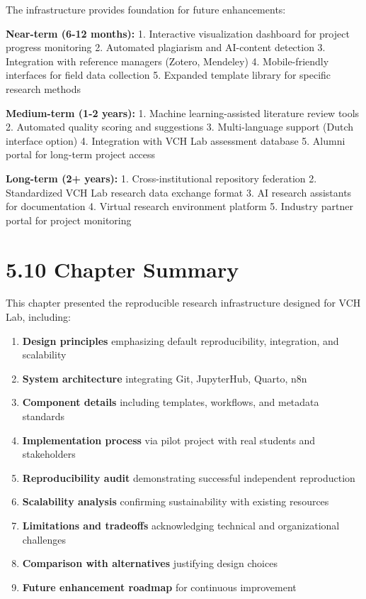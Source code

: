 \documentclass[
  oneside,
  open=any]{scrbook}
\providecommand{\tightlist}{%
  \setlength{\itemsep}{0pt}\setlength{\parskip}{0pt}}\usepackage{longtable,booktabs,array}
\begin{document}
The infrastructure provides foundation for future enhancements:

\textbf{Near-term (6-12 months):} 1. Interactive visualization dashboard
for project progress monitoring 2. Automated plagiarism and AI-content
detection 3. Integration with reference managers (Zotero, Mendeley) 4.
Mobile-friendly interfaces for field data collection 5. Expanded
template library for specific research methods

\textbf{Medium-term (1-2 years):} 1. Machine learning-assisted
literature review tools 2. Automated quality scoring and suggestions 3.
Multi-language support (Dutch interface option) 4. Integration with VCH
Lab assessment database 5. Alumni portal for long-term project access

\textbf{Long-term (2+ years):} 1. Cross-institutional repository
federation 2. Standardized VCH Lab research data exchange format 3. AI
research assistants for documentation 4. Virtual research environment
platform 5. Industry partner portal for project monitoring

\section{5.10 Chapter Summary}\label{chapter-summary-3}

This chapter presented the reproducible research infrastructure designed
for VCH Lab, including:

\begin{enumerate}
\def\labelenumi{\arabic{enumi}.}
\tightlist
\item
  \textbf{Design principles} emphasizing default reproducibility,
  integration, and scalability
\item
  \textbf{System architecture} integrating Git, JupyterHub, Quarto, n8n
\item
  \textbf{Component details} including templates, workflows, and
  metadata standards
\item
  \textbf{Implementation process} via pilot project with real students
  and stakeholders
\item
  \textbf{Reproducibility audit} demonstrating successful independent
  reproduction
\item
  \textbf{Scalability analysis} confirming sustainability with existing
  resources
\item
  \textbf{Limitations and tradeoffs} acknowledging technical and
  organizational challenges
\item
  \textbf{Comparison with alternatives} justifying design choices
\item
  \textbf{Future enhancement roadmap} for continuous improvement
\end{enumerate}
\end{document}
